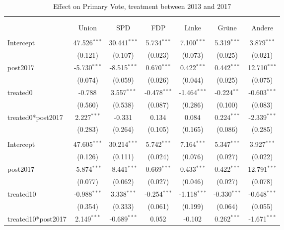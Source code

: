 \documentclass[12pt]{article}
\begin{document}
 
\begin{table}[!htbp] \centering
  \caption{Effect on Primary Vote, treatment between 2013 and 2017}
\begin{tabular}{@{\extracolsep{5pt}}lcccccc}
\\[-1.8ex]\hline
\hline \\[-1.8ex]
\\[-1.8ex] & \multicolumn{1}{c}{Union} & \multicolumn{1}{c}{SPD} & \multicolumn{1}{c}{FDP} & \multicolumn{1}{c}{Linke} & \multicolumn{1}{c}{Grüne} & \multicolumn{1}{c}{Andere}  \\
\hline \\[-1.8ex]
 Intercept & 47.526$^{***}$ & 30.441$^{***}$ & 5.734$^{***}$ & 7.100$^{***}$ & 5.319$^{***}$ & 3.879$^{***}$ \\
  & (0.121) & (0.107) & (0.023) & (0.073) & (0.025) & (0.021) \\
 post2017 & -5.730$^{***}$ & -8.515$^{***}$ & 0.670$^{***}$ & 0.422$^{***}$ & 0.442$^{***}$ & 12.710$^{***}$ \\
  & (0.074) & (0.059) & (0.026) & (0.044) & (0.025) & (0.075) \\
 treated0 & -0.788$^{}$ & 3.557$^{***}$ & -0.478$^{***}$ & -1.464$^{***}$ & -0.224$^{**}$ & -0.603$^{***}$ \\
  & (0.560) & (0.538) & (0.087) & (0.286) & (0.100) & (0.083) \\
 treated0*post2017 & 2.227$^{***}$ & -0.331$^{}$ & 0.134$^{}$ & 0.084$^{}$ & 0.224$^{***}$ & -2.339$^{***}$ \\
  & (0.283) & (0.264) & (0.105) & (0.165) & (0.086) & (0.285) \\
\hline \\[-1.8ex]
 Intercept & 47.605$^{***}$ & 30.214$^{***}$ & 5.742$^{***}$ & 7.164$^{***}$ & 5.347$^{***}$ & 3.927$^{***}$ \\
  & (0.126) & (0.111) & (0.024) & (0.076) & (0.027) & (0.022) \\
 post2017 & -5.874$^{***}$ & -8.441$^{***}$ & 0.669$^{***}$ & 0.433$^{***}$ & 0.422$^{***}$ & 12.791$^{***}$ \\
  & (0.077) & (0.062) & (0.027) & (0.046) & (0.027) & (0.078) \\
 treated10 & -0.988$^{***}$ & 3.338$^{***}$ & -0.254$^{***}$ & -1.118$^{***}$ & -0.330$^{***}$ & -0.648$^{***}$ \\
  & (0.354) & (0.333) & (0.061) & (0.199) & (0.064) & (0.055) \\
 treated10*post2017 & 2.149$^{***}$ & -0.689$^{***}$ & 0.052$^{}$ & -0.102$^{}$ & 0.262$^{***}$ & -1.671$^{***}$ \\

\end{tabular}
\end{table}
\end{document}
